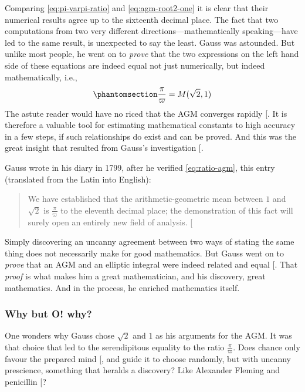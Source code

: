 \documentclass[
  a4paper,
]{article}
\begin{document}
Comparing \cref{eq:pi-varpi-ratio} and \cref{eq:agm-root2-one} it is
clear that their numerical results agree up to the sixteenth decimal
place. The fact that two computations from two very different
directions---mathematically speaking---have led to the same result, is
unexpected to say the least. Gauss was astounded. But unlike most
people, he went on to \emph{prove} that the two expressions on the left
hand side of these equations are indeed equal not just numerically, but
indeed mathematically, i.e.,
\begin{equation}\phantomsection\label{eq:ratio-agm}{
\frac{\pi}{\varpi} = M(\sqrt{2}, 1)
}\end{equation} The astute reader would have no riced that the AGM
converges rapidly {[}\citeproc{ref-pi-and-the-agm}{35}{]}. It is
therefore a valuable tool for estimating mathematical constants to high
accuracy in a few steps, if such relationships do exist and can be
proved. And this was the great insight that resulted from Gauss's
investigation {[}\citeproc{ref-pi-and-the-agm}{35}{]}.

Gauss wrote in his diary in 1799, after he verified \cref{eq:ratio-agm},
this entry (translated from the Latin into English):

\begin{quote}
We have established that the arithmetic-geometric mean between \(1\) and
\(\sqrt{2}\) is \(\frac{\pi}{\varpi}\) to the eleventh decimal place;
the demonstration of this fact will surely open an entirely new field of
analysis. {[}\citeproc{ref-cox-1984}{32}{]}
\end{quote}

Simply discovering an uncanny agreement between two ways of stating the
same thing does not necessarily make for good mathematics. But Gauss
went on to \emph{prove} that an AGM and an elliptic integral were indeed
related and equal {[}\citeproc{ref-singh-2009}{36}{]}. That \emph{proof}
is what makes him a great mathematician, and his discovery, great
mathematics. And in the process, he enriched mathematics itself.

\subsubsection{Why but O! why?}\label{why-but-o-why}

One wonders why Gauss chose \(\sqrt{2}\) and \(1\) as his arguments for
the AGM. It was that choice that led to the serendipitous equality to
the ratio \(\frac{\pi}{\varpi}\). Does chance only favour the prepared
mind {[}\citeproc{ref-chance}{37}{]}, and guide it to choose randomly,
but with uncanny prescience, something that heralds a discovery? Like
Alexander Fleming and penicillin {[}\citeproc{ref-penicillin}{38}{]}?
\end{document}
